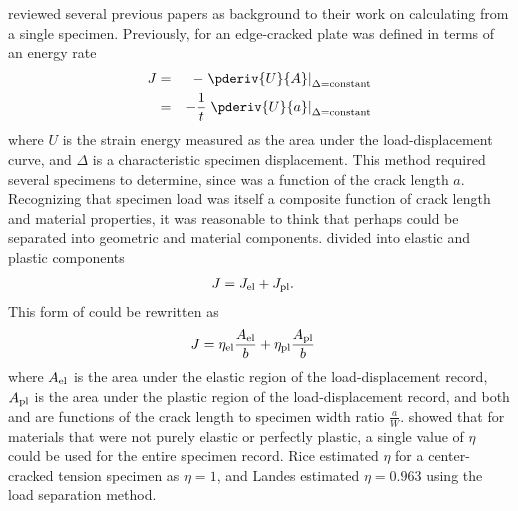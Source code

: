 \citet{sharobeamlandes1991} reviewed several previous papers as background to their work on calculating \J from a single specimen.
Previously, \J for an edge-cracked plate was defined in terms of an energy rate
\begin{alignat}{2}
\J &=& - \left. \pderiv{U}{A} \right|_{\Delta=\textnormal{constant}} \\
   &=& - \frac{1}{t} \left. \pderiv{U}{a} \right|_{\Delta=\textnormal{constant}}
\end{alignat}
where \(U\) is the strain energy measured as the area under the load-dis\-place\-ment curve, and \(\Delta\) is a characteristic specimen displacement.
This method required several specimens to determine, since \J was a function of the crack length \(a\).
Recognizing that specimen load was itself a composite function of crack length and material properties, it was reasonable to think that perhaps \J could be separated into geometric and material components.
\citet{riceparismerkle1973} divided \J into elastic and plastic components
\begin{align}
J &= J_\textnormal{el} + J_\textnormal{pl} .
\end{align}
This form of \J could be rewritten as
\begin{align}
J &= \eta_\textnormal{el} \frac{A_\textnormal{el}}{b} + \eta_\textnormal{pl} \frac{A_\textnormal{pl}}{b} \label{eq:j-eta}
\end{align}
where
\(A_\textnormal{el}\) is the area under the elastic region of the load-dis\-place\-ment record, 
\(A_\textnormal{pl}\) is the area under the plastic region of the load-dis\-place\-ment record, and both \etael and \etapl are functions of the crack length to specimen width ratio \(\frac{a}{W}\).
\citet{turner1980} showed that for materials that were not purely elastic or perfectly plastic, a single value of \(\eta\) could be used for the entire specimen record.
Rice estimated \(\eta\) for a center-cracked tension specimen as \(\eta = 1\), and Landes estimated \(\eta = 0.963\) using the load separation method.

